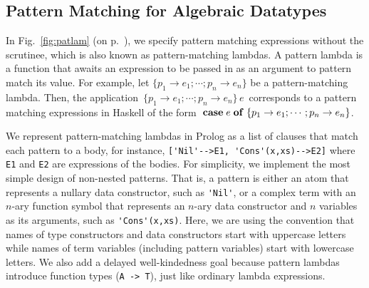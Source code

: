 \documentclass[runningheads,a4paper]{llncs}
\begin{document}
\subsection{Pattern Matching for Algebraic Datatypes}\label{ssec:patlam}
In Fig.~\ref{fig:patlam} (on p.~\pageref{fig:patlam}), we specify
pattern matching expressions without the scrutinee, which is
also known as pattern-matching lambdas. A pattern lambda is
a function that awaits an expression to be passed in
as an argument to pattern match its value. For example,
let $\{p_1\to e_1;\cdots; p_n\to e_n\}$ be a pattern-matching lambda.
Then, the application $\,\{p_1\to e_1;\cdots; p_n\to e_n\}\,e\,$
corresponds to a pattern matching expressions in Haskell of the form
${\bf\;case}\;e\;{\bf of}\;\{p_1\to e_1;\cdots; p_n\to e_n\}$.

We represent pattern-matching lambdas in Prolog as a list of clauses
that match each pattern to a body, for instance,
\verb|['Nil'-->E1, 'Cons'(x,xs)-->E2]|
where \verb|E1| and \verb|E2| are expressions of the bodies. For simplicity,
we implement the most simple design of non-nested patterns. That is,
a pattern is either an atom that represents a nullary data constructor,
such as \verb|'Nil'|, or a complex term with an $n$-ary function symbol
that represents an $n$-ary data constructor and $n$ variables as its arguments,
such as \verb|'Cons'(x,xs)|.
Here, we are using the convention that names of type constructors and
data constructors start with uppercase letters while names of term variables
(including pattern variables) start with lowercase letters. We also add
a delayed well-kindedness goal because pattern lambdas introduce function types
(\verb|A -> T|), just like ordinary lambda expressions.

\end{document}
